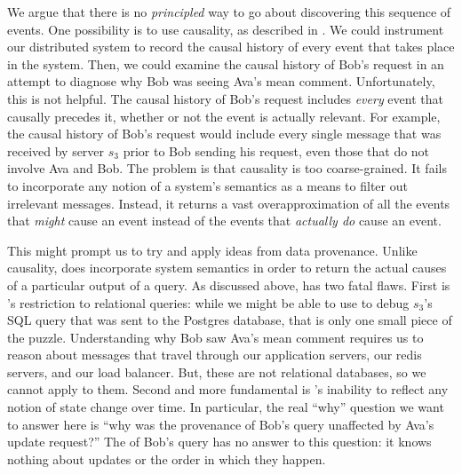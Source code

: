 We argue that there is no \emph{principled} way to go about discovering this
sequence of events. 
One possibility is to use causality, as described in
. We could instrument our distributed system to record the
causal history of every event that takes place in the system. Then, we could
examine the causal history of Bob's request in an attempt to diagnose why Bob
was seeing Ava's mean comment. Unfortunately, this is not helpful. The causal
history of Bob's request includes \emph{every} event that causally precedes it,
whether or not the event is actually relevant. For example, the causal history
of Bob's request would include every single message that was received by server
$s_3$ prior to Bob sending his request, even those that do not involve Ava and
Bob. The problem is that causality is too coarse-grained. It fails to
incorporate any notion of a system's semantics as a means to filter out
irrelevant messages.  Instead, it returns a vast overapproximation of all the
events that \emph{might} cause an event instead of the events that
\emph{actually do} cause an event.

This might prompt us to try and apply ideas from data provenance. Unlike
causality, \whyprovenance{} does incorporate system semantics in order to
return the actual causes of a particular output of a query. 
As discussed above,
\whyprovenance{} has two fatal flaws. 
First is \whyprovenance{}'s restriction to relational queries: while we
might be able to use \whyprovenance{} to debug $s_3$'s SQL query that was sent
to the Postgres database, 
that is only one small piece of the puzzle.
Understanding why Bob saw Ava's mean comment requires us to reason about
messages that travel through our application servers, our redis servers, and
our load balancer. But, these are not relational databases, so we cannot apply
\whyprovenance{} to them. Second and more fundamental is \whyprovenance{}'s inability to reflect any
notion of state change over time. 
In particular, the real ``why'' question we want to answer here is ``why was the provenance of Bob's query unaffected by Ava's update request?''
The \whyprovenance{} of Bob's query has no answer to this question: it knows nothing about updates or the order in which they happen.

